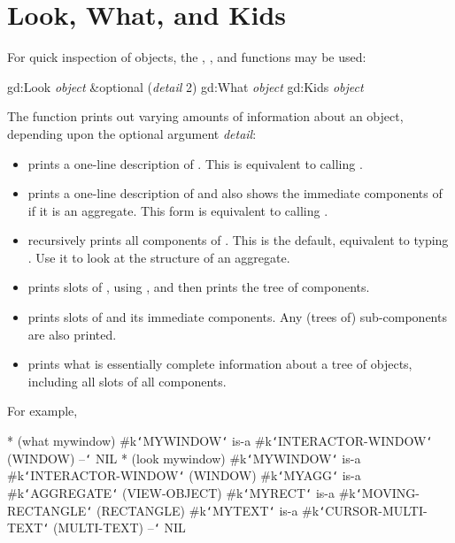 \section{Look, What, and Kids}
For quick inspection of objects, the , , and 
functions may be used:
\begin{programexample}
gd:Look {\it object} \&optional ({\it detail} 2)\value{function}
gd:What {\it object}\value{function}
gd:Kids {\it object}\value{function}
\end{programexample}
The  function prints out varying amounts of information
about an object, depending upon the optional argument {\it detail}:
\begin{itemize}
\item {} prints a one-line description of .  This
is equivalent to calling .

\item {} prints a one-line description of  and also
shows the immediate components of  if it is an aggregate.
This form is equivalent to calling .

\item {} recursively prints all components of .
This is the default, equivalent to typing .  Use
it to look at the structure of an aggregate.

\item {} prints slots of , using , and
then prints the tree of components.

\item {} prints slots of  and its immediate
components.  Any (trees of) sub-components are also printed.

\item {} prints what is essentially complete information
about a tree of objects, including all slots of all components.
\end{itemize}
For example,
\begin{programexample}
* (what mywindow)
\#k{\tt\char`\<}MYWINDOW{\tt\char`\>} is-a \#k{\tt\char`\<}INTERACTOR-WINDOW{\tt\char`\>} (WINDOW)
--{\tt\char`\>} NIL
* (look mywindow)
\#k{\tt\char`\<}MYWINDOW{\tt\char`\>} is-a \#k{\tt\char`\<}INTERACTOR-WINDOW{\tt\char`\>} (WINDOW)
   \#k{\tt\char`\<}MYAGG{\tt\char`\>} is-a \#k{\tt\char`\<}AGGREGATE{\tt\char`\>} (VIEW-OBJECT)
      \#k{\tt\char`\<}MYRECT{\tt\char`\>} is-a \#k{\tt\char`\<}MOVING-RECTANGLE{\tt\char`\>} (RECTANGLE)
      \#k{\tt\char`\<}MYTEXT{\tt\char`\>} is-a \#k{\tt\char`\<}CURSOR-MULTI-TEXT{\tt\char`\>} (MULTI-TEXT)
--{\tt\char`\>} NIL
\end{programexample}

